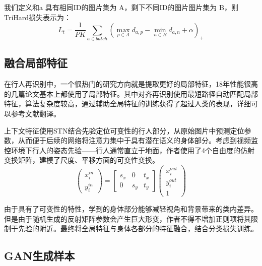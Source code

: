     我们定义和a 具有相同ID的图片集为 A，剩下不同ID的图片图片集为 B，则TriHard损失表示为：
    \begin{equation} 
        L_t=\frac{1}{PK}\sum_{a \in batch} \left( \max_{p \in A} d_{a,p} -  \min_{n \in B} d_{a,n} +\alpha \right)_+
    \end{equation}

    \subsection{融合局部特征}

    在行人再识别中，一个很热门的研究方向就是提取更好的局部特征\cite{reciprocal,liu2017hydraplus,zhao2017spindle,glad}，18年性能很高的几篇论文基本上都使用了局部特征\cite{liu2017hydraplus,zhao2017spindle}。其中对齐再识别\cite{zhang2017align}使用最短路径自动匹配局部特征，算法复杂度较高，通过辅助全局特征的训练获得了超过人类的表现，详细可以参考文献翻译。

    上下文特征\cite{latent}使用STN结合先验定位可变性的行人部分，从原始图片中预测定位参数，从而便于后续的网络将注意力集中于具有潜在语义的身体部分。考虑到视频监控环境下行人的姿态先验——行人通常直立于地面，作者使用了4个自由度的仿射变换矩阵，建模了尺度、平移方面的可变性变换。
    \begin{equation} 
        \left(\begin{array}{c} 
        x^{in}_i \\
        y^{in}_i
        \end{array}\right) =\left[ \begin{array}{ccc}
        s_x & 0 & t_x \\
        0 & s_y & t_y
        \end{array}\right] \left(\begin{array}{c}
        x^{out}_{i} \\
        y^{out}_i \\
        1
        \end{array}\right)
    \end{equation}

    由于具有了可变性的特性，学到的身体部分能够减轻视角和背景带来的类内差异。但是由于随机生成的反射矩阵参数会产生巨大形变，作者不得不增加正则项将其限制于先验的附近。最终将全局特征与身体各部分的特征融合，结合分类损失训练。

    \subsection{GAN生成样本}

